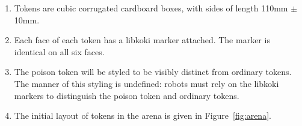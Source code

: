 \begin{enumerate}
  \item Tokens are cubic corrugated cardboard boxes, with sides of length
        \si{110}{mm} $\pm$ \si{10}{mm}.
  \item Each face of each token has a libkoki marker attached. The marker is
        identical on all six faces.
  \item The poison token will be styled to be visibly distinct from ordinary
        tokens. The manner of this styling is undefined: robots must rely on
        the libkoki markers to distinguish the poison token and ordinary
        tokens.
  \item The initial layout of tokens in the arena is given in
        Figure~\ref{fig:arena}.
\end{enumerate}

